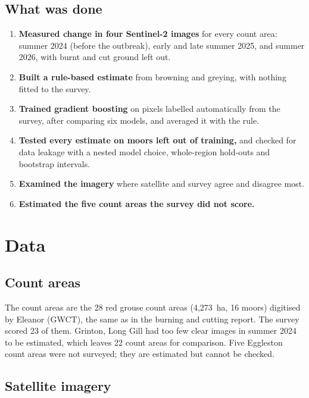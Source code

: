 \documentclass[11pt,a4paper]{article}
\begin{document}
\subsection{What was done}

\begin{enumerate}
\item \textbf{Measured change in four Sentinel-2 images} for every count area: summer 2024 (before the outbreak), early and late summer 2025, and summer 2026, with burnt and cut ground left out.
\item \textbf{Built a rule-based estimate} from browning and greying, with nothing fitted to the survey.
\item \textbf{Trained gradient boosting} on pixels labelled automatically from the survey, after comparing six models, and averaged it with the rule.
\item \textbf{Tested every estimate on moors left out of training,} and checked for data leakage with a nested model choice, whole-region hold-outs and bootstrap intervals.
\item \textbf{Examined the imagery} where satellite and survey agree and disagree most.
\item \textbf{Estimated the five count areas the survey did not score.}
\end{enumerate}

\FloatBarrier
\section{Data}\label{sec:data}

\subsection{Count areas}

The count areas are the 28 red grouse count areas (4,273~ha, 16 moors) digitised by Eleanor (GWCT), the same as in the burning and cutting report. The survey scored 23 of them. Grinton, Long Gill had too few clear images in summer 2024 to be estimated, which leaves 22 count areas for comparison. Five Eggleston count areas were not surveyed; they are estimated but cannot be checked.

\subsection{Satellite imagery}
\end{document}
